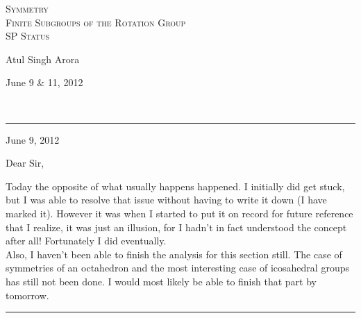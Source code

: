 \documentclass[12pt]{article}
\begin{document}



\begin{center}
\textsc{{\huge Symmetry\\}
Finite Subgroups of the Rotation Group\\
\small SP Status\\}
\begin{minipage}{0.4\textwidth}
\begin{flushleft} Atul Singh Arora \end{flushleft}
\end{minipage}
\begin{minipage}{0.4\textwidth}
\begin{flushright} {\small June 9 \& 11, 2012} \end{flushright}
\end{minipage}
\\
\end{center}
\hrule
June 9, 2012
\par
Dear Sir,
\par
Today the opposite of what usually happens happened. I initially did get stuck, but I was able to resolve that issue without having to write it down (I have marked it). However it was when I started to put it on record for future reference that I realize, it was just an illusion, for I hadn't in fact understood the concept after all! Fortunately I did eventually.\\
Also, I haven't been able to finish the analysis for this section still. The case of symmetries of an octahedron and the most interesting case of icosahedral groups has still not been done. I would most likely be able to finish that part by tomorrow.\\
\par
\hrule
\vspace{12pt}
\end{document}
